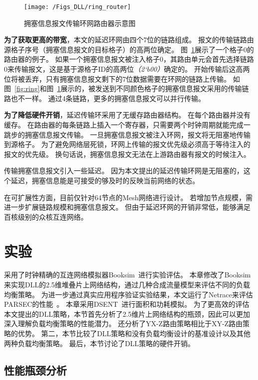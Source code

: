 \begin{figure}[htbp] %
  \centering
  \texttt{[image: /Figs\_DLL/ring\_router]}
  \caption{拥塞信息报文传输环网路由器示意图}
  \label{fig:ring_router}
\end{figure}

\textbf{为了获取更高的带宽}，本文的延迟环网由四个7位的链路组成。
报文的传输链路由源格子序号（拥塞信息报文的目标格子）的高两位确定。
图~\ref{fig:ring_router}展示了一个格子0的路由器的例子。
如果一个拥塞信息报文被注入格子0，其路由单元会首先选择链路0来传输报文，这是基于源格子ID的高两位\emph{（2‘b00）}确定的。
开始传输后这高两位将被丢弃，只有拥塞信息报文剩下的7位数据需要在环网的链路上传输。
如图~\ref{fig:ring}和图~\ref{fig:ring_router}展示的，被发送到不同颜色格子的拥塞信息报文采用的传输链路也不一样。
通过4条链路，更多的拥塞信息报文可以并行传输。

\textbf{为了降低硬件开销}，延迟传输环采用了无缓存路由器结构。
在每个路由器并没有缓存。
在路由器的每条链路上插入一个寄存器，只需要两个时钟周期就能完成一跳步的拥塞信息报文传输。
一旦拥塞信息报文被注入环网，报文将无阻塞地传输到源格子。
为了避免网络层死锁，环网上传输的报文优先级必须高于等待注入的报文的优先级。
换句话说，拥塞信息报文无法在上游路由器有报文的时候注入。

传输拥塞信息报文引入一些延迟。
因为本文提出的延迟传输环网是无阻塞的，这个延迟，拥塞信息能是可接受的够及时的反映当前网络的状态。

在可扩展性方面，目前仅针对64节点的Mesh网络进行设计。
若增加节点规模，需进一步扩展链路规模和拥塞信息报文。
但由于延迟环网的开销非常低，能够满足百核级别的众核互连网络。

\section{实验}
\label{sec:dllexperiment}
采用了时钟精确的互连网络模拟器Booksim~进行实验评估。
本章修改了Booksim来实现DLL的2.5维堆叠片上网络结构，通过几种合成流量模型来评估不同的负载均衡策略。
为进一步通过真实应用程序验证实验结果，本文运行了Netrace来评估PARSEC的性能~。
本章采用DSENT~进行面积和功耗模拟。
为了更高效的评估本文提出的DLL策略，本节首先分析了2.5维片上网络结构的瓶颈，因此可以更加深入理解负载均衡策略的性能潜力。
还分析了YX-Z路由策略相比于XY-Z路由策略的优势。
第二，本节比较了DLL策略和没有负载均衡设计的基准设计以及其他两种负载均衡策略。
最后，本节讨论了DLL策略的硬件开销。

\subsection{性能瓶颈分析}

